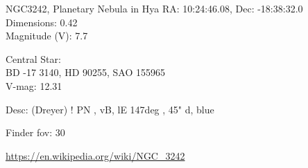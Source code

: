 \begin{block}{NGC3242, Planetary Nebula in Hya}
    RA: 10:24:46.08, Dec: -18:38:32.0 \\ 
    Dimensions: 0.42 \\ 
    Magnitude (V): 7.7

    Central Star: \\ 
      \hspace{1em}BD -17 3140, HD 90255, SAO 155965 \\ 
      \hspace{1em}V-mag: 12.31 

    Desc: (Dreyer) ! PN , vB, lE 147deg , 45" d, blue 

    Finder fov: 30 

    \url{https://en.wikipedia.org/wiki/NGC_3242} 
\end{block}